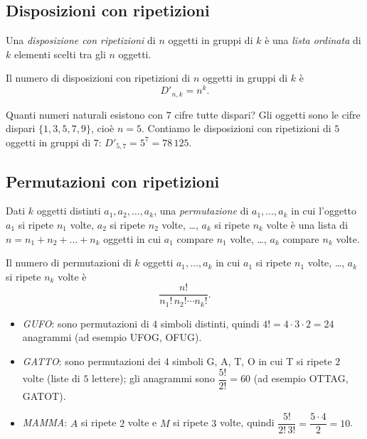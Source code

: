 \documentclass[11pt,a4paper]{article}
\begin{document}
\subsection{Disposizioni con ripetizioni}

\begin{definizione}
Una \emph{disposizione con ripetizioni} di $n$ oggetti in gruppi di $k$ è una \emph{lista ordinata} di $k$ elementi scelti tra gli $n$ oggetti.
\end{definizione}

\begin{proposizione}
Il numero di disposizioni con ripetizioni di $n$ oggetti in gruppi di $k$ è
\[
D'_{n,k} = n^k .
\]
\end{proposizione}

\begin{esempio}
Quanti numeri naturali esistono con $7$ cifre tutte dispari? Gli oggetti sono le cifre dispari $\{1, 3, 5, 7, 9\}$, cioè $n = 5$. Contiamo le disposizioni con ripetizioni di $5$ oggetti in gruppi di $7$: $D'_{5,7} = 5^7 = 78\,125$.
\end{esempio}

\subsection{Permutazioni con ripetizioni}

\begin{definizione}
Dati $k$ oggetti distinti $a_1, a_2, \dots, a_k$, una \emph{permutazione} di $a_1, \dots, a_k$ in cui l'oggetto $a_1$ si ripete $n_1$ volte, $a_2$ si ripete $n_2$ volte, \dots, $a_k$ si ripete $n_k$ volte è una lista di $n = n_1 + n_2 + \dots + n_k$ oggetti in cui $a_1$ compare $n_1$ volte, \dots, $a_k$ compare $n_k$ volte.
\end{definizione}

\begin{proposizione}
Il numero di permutazioni di $k$ oggetti $a_1, \dots, a_k$ in cui $a_1$ si ripete $n_1$ volte, \dots, $a_k$ si ripete $n_k$ volte è
\[
\frac{n!}{n_1!\, n_2! \cdots n_k!} .
\]
\end{proposizione}

\begin{esempio}[Anagrammi]
\leavevmode
\begin{itemize}
    \item \emph{GUFO}: sono permutazioni di $4$ simboli distinti, quindi $4! = 4 \cdot 3 \cdot 2 = 24$ anagrammi (ad esempio UFOG, OFUG).
    \item \emph{GATTO}: sono permutazioni dei $4$ simboli G, A, T, O in cui T si ripete $2$ volte (liste di $5$ lettere); gli anagrammi sono $\dfrac{5!}{2!} = 60$ (ad esempio OTTAG, GATOT).
    \item \emph{MAMMA}: $A$ si ripete $2$ volte e $M$ si ripete $3$ volte, quindi $\dfrac{5!}{2!\,3!} = \dfrac{5 \cdot 4}{2} = 10$.
\end{itemize}
\end{esempio}
\end{document}
